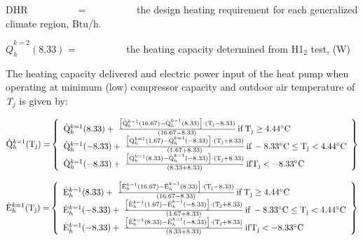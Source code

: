 DHR ~~~~~~~~~ = ~~~~~~~~~ the design heating requirement for each generalized climate region, Btu/h.

\(\dot Q_h^{k = 2}(8.33)\) = ~~~~~~~~~ the heating capacity determined from H1\(_{2}\) test, (W)

The heating capacity delivered and electric power input of the heat pump when operating at minimum (low) compressor capacity and outdoor air temperature of \emph{T\(_{j}\)} is given by:

\begin{equation}
{\rm{\dot Q}}_h^{k = 1}{\rm{(}}{{\rm{T}}_{\rm{j}}}{\rm{) = }}\left\{ 
    \begin{array}{l}
      {\rm{\dot Q}}_h^{k = 1}(8.33) + \;\frac{{\left[ {{\rm{\dot Q}}_h^{k = 1}{\rm{(16}}{\rm{.67) - \dot Q}}_h^{k = 1}{\rm{(8}}{\rm{.33)}}} \right] \cdot \left( {{{\rm{T}}_{\rm{j}}} - 8.33} \right)}}{{\left( {16.67 - 8.33} \right)}}\,{\rm{if}}\,{{\rm{T}}_{\rm{j}}} \ge 4.44{\rm{^\circ C}} \\
      {\rm{\dot Q}}_h^{k = 1}( - 8.33) + \;\frac{{\left[ {{\rm{\dot Q}}_h^{k = 1}{\rm{(1}}{\rm{.67) - \dot Q}}_h^{k = 1}{\rm{( - 8}}{\rm{.33)}}} \right] \cdot \left( {{{\rm{T}}_{\rm{j}}} + 8.33} \right)}}{{\left( {1.67 + 8.33} \right)}}\,{\rm{if}}\, - 8.33{\rm{^\circ C}} \le {{\rm{T}}_{\rm{j}}} < 4.44{\rm{^\circ C}} \\
      {\rm{\dot Q}}_h^{k = 1}( - 8.33) + \;\frac{{\left[ {{\rm{\dot Q}}_h^{k = 1}{\rm{(8}}{\rm{.33) - \dot Q}}_h^{k = 1}{\rm{( - 8}}{\rm{.33)}}} \right] \cdot \left( {{{\rm{T}}_{\rm{j}}} + 8.33} \right)}}{{\left( {8.33 + 8.33} \right)}}\,{\rm{if }}{{\rm{T}}_{\rm{j}}} <  - 8.33{\rm{^\circ C}}\,
    \end{array}
  \right\}
\end{equation}

\begin{equation}
{\rm{\dot E}}_h^{k = 1}{\rm{(}}{{\rm{T}}_{\rm{j}}}{\rm{) = }}\left\{
    \begin{array}{l}
      {\rm{\dot E}}_h^{k = 1}(8.33) + \;\frac{{\left[ {{\rm{\dot E}}_h^{k = 1}{\rm{(16}}{\rm{.67) - \dot E}}_h^{k = 1}{\rm{(8}}{\rm{.33)}}} \right] \cdot \left( {{{\rm{T}}_{\rm{j}}} - 8.33} \right)}}{{\left( {16.67 - 8.33} \right)}}\,{\rm{if}}\,{{\rm{T}}_{\rm{j}}} \ge 4.44{\rm{^\circ C}} \\
      {\rm{\dot E}}_h^{k = 1}( - 8.33) + \;\frac{{\left[ {{\rm{\dot E}}_h^{k = 1}{\rm{(1}}{\rm{.67) - \dot E}}_h^{k = 1}{\rm{( - 8}}{\rm{.33)}}} \right] \cdot \left( {{{\rm{T}}_{\rm{j}}} + 8.33} \right)}}{{\left( {1.67 + 8.33} \right)}}\,{\rm{if}}\, - 8.33{\rm{^\circ C}} \le {{\rm{T}}_{\rm{j}}} < 4.44{\rm{^\circ C}} \\
      {\rm{\dot E}}_h^{k = 1}( - 8.33) + \;\frac{{\left[ {{\rm{\dot E}}_h^{k = 1}{\rm{(8}}{\rm{.33) - \dot E}}_h^{k = 1}{\rm{( - 8}}{\rm{.33)}}} \right] \cdot \left( {{{\rm{T}}_{\rm{j}}} + 8.33} \right)}}{{\left( {8.33 + 8.33} \right)}}\,{\rm{if }}{{\rm{T}}_{\rm{j}}} <  - 8.33{\rm{^\circ C}}\,
    \end{array}
  \right\}
\end{equation}

